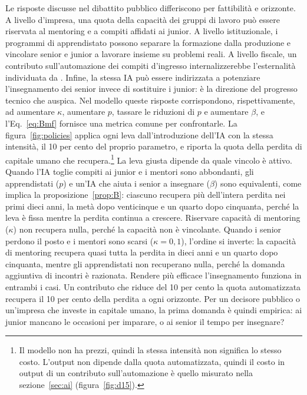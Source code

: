 \documentclass[preprint,12pt,authoryear]{elsarticle}
\begin{document}
Le risposte discusse nel dibattito pubblico differiscono per fattibilità e orizzonte. A livello d'impresa, una quota della capacità dei gruppi di lavoro può essere riservata al mentoring e a compiti affidati ai junior. A livello istituzionale, i programmi di apprendistato possono separare la formazione dalla produzione e vincolare senior e junior a lavorare insieme su problemi reali. A livello fiscale, un contributo sull'automazione dei compiti d'ingresso internalizzerebbe l'esternalità individuata da \citet{Ide2026}. Infine, la stessa IA può essere indirizzata a potenziare l'insegnamento dei senior invece di sostituire i junior: è la direzione del progresso tecnico che \citet{Acemoglu2024} auspica. Nel modello queste risposte corrispondono, rispettivamente, ad aumentare $\kappa$, aumentare $p$, tassare le riduzioni di $p$ e aumentare $\beta$, e l'Eq.~\eqref{eq:Bmf} fornisce una metrica comune per confrontarle. La figura~\ref{fig:policies} applica ogni leva dall'introduzione dell'IA con la stessa intensità, il 10 per cento del proprio parametro, e riporta la quota della perdita di capitale umano che recupera.\footnote{Il modello non ha prezzi, quindi la stessa intensità non significa lo stesso costo. L'output non dipende dalla quota automatizzata, quindi il costo in output di un contributo sull'automazione è quello misurato nella sezione~\ref{sec:ai} (figura~\ref{fig:d15}).} La leva giusta dipende da quale vincolo è attivo. Quando l'IA toglie compiti ai junior e i mentori sono abbondanti, gli apprendistati ($p$) e un'IA che aiuta i senior a insegnare ($\beta$) sono equivalenti, come implica la proposizione~\ref{prop:B}: ciascuno recupera più dell'intera perdita nei primi dieci anni, la metà dopo venticinque e un quarto dopo cinquanta, perché la leva è fissa mentre la perdita continua a crescere. Riservare capacità di mentoring ($\kappa$) non recupera nulla, perché la capacità non è vincolante. Quando i senior perdono il posto e i mentori sono scarsi ($\kappa=0{,}1$), l'ordine si inverte: la capacità di mentoring recupera quasi tutta la perdita in dieci anni e un quarto dopo cinquanta, mentre gli apprendistati non recuperano nulla, perché la domanda aggiuntiva di incontri è razionata. Rendere più efficace l'insegnamento funziona in entrambi i casi. Un contributo che riduce del 10 per cento la quota automatizzata recupera il 10 per cento della perdita a ogni orizzonte. Per un decisore pubblico o un'impresa che investe in capitale umano, la prima domanda è quindi empirica: ai junior mancano le occasioni per imparare, o ai senior il tempo per insegnare?
\end{document}
